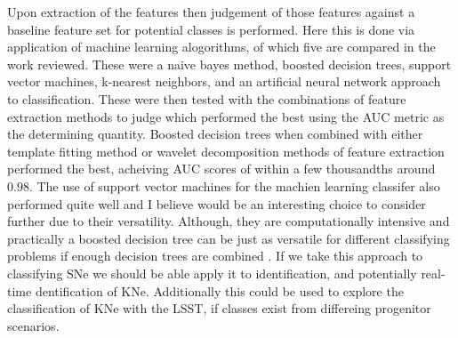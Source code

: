 \documentclass[12pt]{article}
\begin{document}
Upon extraction of the features then judgement of those features against a baseline feature set for potential classes is performed. Here this is done via application of machine learning alogorithms, of which five are compared in the work reviewed. These were a naive bayes method, boosted decision trees, support vector machines, k-nearest neighbors, and an artificial neural network approach to classification. These were then tested with the combinations of feature extraction methods to judge which performed the best using the AUC metric as the determining quantity. Boosted decision trees when combined with either template fitting method or wavelet decomposition methods of feature extraction performed the best, acheiving AUC scores of within a few thousandths around $0.98$. The use of support vector machines for the machien learning classifer also performed quite well and I believe would be an interesting choice to consider further due to their versatility. Although, they are computationally intensive and practically a boosted decision tree can be just as versatile for different classifying problems if enough decision trees are combined \citep{Lochner2016}. If we take this approach to classifying SNe we should be able apply it to identification, and potentially real-time dentification of KNe. Additionally this could be used to explore the classification of KNe with the LSST, if classes exist from differeing progenitor scenarios. \par
\end{document}
